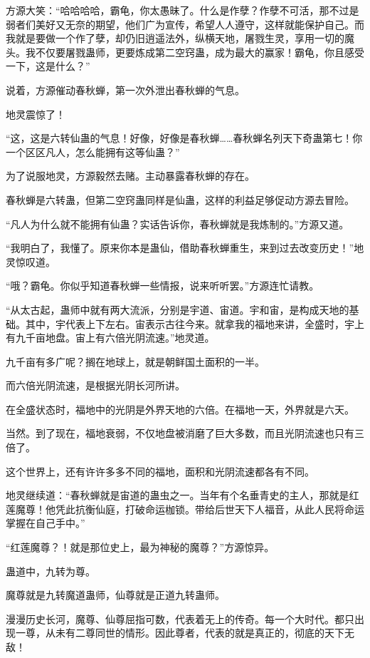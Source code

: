 \begin{this_body}
方源大笑：“哈哈哈哈，霸龟，你太愚昧了。什么是作孽？作孽不可活，那不过是弱者们美好又无奈的期望，他们广为宣传，希望人人遵守，这样就能保护自己。而我就是要做一个作了孽，却仍旧逍遥法外，纵横天地，屠戮生灵，享用一切的魔头。我不仅要屠戮蛊师，更要炼成第二空窍蛊，成为最大的赢家！霸龟，你且感受一下，这是什么？”

说着，方源催动春秋蝉，第一次外泄出春秋蝉的气息。

地灵震惊了！

“这，这是六转仙蛊的气息！好像，好像是春秋蝉……春秋蝉名列天下奇蛊第七！你一个区区凡人，怎么能拥有这等仙蛊？”

为了说服地灵，方源毅然去赌。主动暴露春秋蝉的存在。

春秋蝉是六转蛊，但第二空窍蛊同样是仙蛊，这样的利益足够促动方源去冒险。

“凡人为什么就不能拥有仙蛊？实话告诉你，春秋蝉就是我炼制的。”方源又道。

“我明白了，我懂了。原来你本是蛊仙，借助春秋蝉重生，来到过去改变历史！”地灵惊叹道。

“哦？霸龟。你似乎知道春秋蝉一些情报，说来听听罢。”方源连忙请教。

“从太古起，蛊师中就有两大流派，分别是宇道、宙道。宇和宙，是构成天地的基础。其中，宇代表上下左右。宙表示古往今来。就拿我的福地来讲，全盛时，宇上有九千亩地盘。宙上有六倍光阴流速。”地灵道。

九千亩有多广呢？搁在地球上，就是朝鲜国土面积的一半。

而六倍光阴流速，是根据光阴长河所讲。

在全盛状态时，福地中的光阴是外界天地的六倍。在福地一天，外界就是六天。

当然。到了现在，福地衰弱，不仅地盘被消磨了巨大多数，而且光阴流速也只有三倍了。

这个世界上，还有许许多多不同的福地，面积和光阴流速都各有不同。

地灵继续道：“春秋蝉就是宙道的蛊虫之一。当年有个名垂青史的主人，那就是红莲魔尊！他凭此抗衡仙庭，打破命运枷锁。带给后世天下人福音，从此人民将命运掌握在自己手中。”

“红莲魔尊？！就是那位史上，最为神秘的魔尊？”方源惊异。

蛊道中，九转为尊。

魔尊就是九转魔道蛊师，仙尊就是正道九转蛊师。

漫漫历史长河，魔尊、仙尊屈指可数，代表着无上的传奇。每一个大时代。都只出现一尊，从未有二尊同世的情形。因此尊者，代表的就是真正的，彻底的天下无敌！


\end{this_body}
